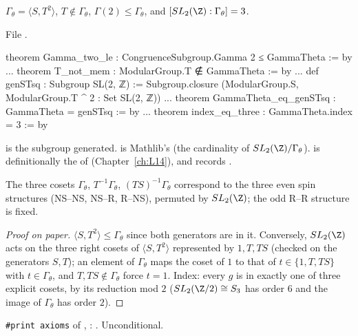\begin{theorem}\label{l17:thm:gammatheta}
$\Gamma_\theta=\langle S,T^2\rangle$, $T\notin\Gamma_\theta$, $\Gamma(2)\le\Gamma_\theta$, and
$[SL_2(\Z):\Gamma_\theta]=3$.
\end{theorem}
\noindent File .
\begin{leancode}
theorem Gamma_two_le : CongruenceSubgroup.Gamma 2 ≤ GammaTheta := by
...
theorem T_not_mem : ModularGroup.T ∉ GammaTheta := by
...
def genSTsq : Subgroup SL(2, ℤ) :=
  Subgroup.closure ({ModularGroup.S, ModularGroup.T ^ 2} : Set SL(2, ℤ))
...
theorem GammaTheta_eq_genSTsq : GammaTheta = genSTsq := by
...
theorem index_eq_three : GammaTheta.index = 3 := by
\end{leancode}
\begin{dictionary}
 is the subgroup generated.  is Mathlib's 
(the cardinality of $SL_2(\Z)/\Gamma_\theta$).  is definitionally the 
of  (Chapter~\ref{ch:L14}), and
 records .
\end{dictionary}
\begin{physics}
The three cosets $\Gamma_\theta$, $T^{-1}\Gamma_\theta$, $(TS)^{-1}\Gamma_\theta$ correspond to the
three even spin structures (NS--NS, NS--R, R--NS), permuted by $SL_2(\Z)$; the odd R--R structure is
fixed.
\end{physics}
\begin{proof}[Proof on paper]
$\langle S,T^2\rangle\le\Gamma_\theta$ since both generators are in it. Conversely, $SL_2(\Z)$ acts on
the three right cosets of $\langle S,T^2\rangle$ represented by $1,T,TS$ (checked on the generators
$S,T$); an element of $\Gamma_\theta$ maps the coset of $1$ to that of $t\in\{1,T,TS\}$ with
$t\in\Gamma_\theta$, and $T,TS\notin\Gamma_\theta$ force $t=1$. Index: every $g$ is in exactly one of
three explicit cosets, by its reduction mod $2$ ($SL_2(\Z/2)\cong S_3$ has order $6$ and the image of
$\Gamma_\theta$ has order $2$).
\end{proof}
\begin{status}
\texttt{\#print axioms} of ,
: . Unconditional.
\end{status}


